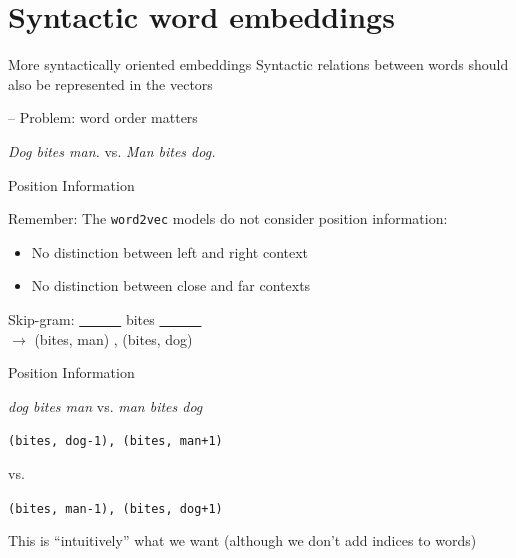 \documentclass[12pt]{beamer}
\begin{document}
\section{Syntactic word embeddings}

\begin{frame}{More syntactically oriented embeddings}
Syntactic relations between words should also be represented in the vectors

-- Problem: word order matters

\emph{Dog bites man.} \hspace{2em} vs. \hspace{2em} \emph{Man bites dog.}
	

\end{frame}

\begin{frame}{Position Information}

Remember: The \texttt{word2vec} models do not consider position information: 

\begin{itemize}
	\item No distinction between left and right context
	\item No distinction between close and far contexts
\end{itemize}



Skip-gram: \underline{~~~~~~} bites \underline{~~~~~~} \\
$\to$ (bites, man) , (bites, dog)


\end{frame}



\begin{frame}{Position Information}
	
	
\emph{dog bites man} \hspace{2em} vs. \hspace{2em} \emph{man bites dog}
	

\texttt{(bites, dog-1), (bites, man+1)}

vs.


\texttt{(bites, man-1), (bites, dog+1)}
	

This is “intuitively” what we want (although we don't add indices to words)
	
\end{frame}
\end{document}
